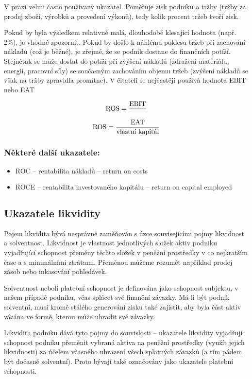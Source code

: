V praxi velmi často používaný ukazatel. Poměřuje zisk podniku a tržby (tržby za prodej zboží, výrobků a provedení výkonů), tedy kolik procent tržeb tvoří zisk.

Pokud by byla výsledkem relativně malá, dlouhodobě klesající hodnota (např. 2\%), je vhodné zpozornit. Pokud by došlo k náhlému poklesu tržeb při zachování nákladů (což je běžné), je zřejmé, že se podnik dostane do finančních potíží. Stejnětak se může dostat do potíží při zvýšení nákladů (zdražení materiálu, energií, pracovní síly) se současným zachováním objemu tržeb (zvýšení nákladů se však na tržby zpravidla promítne). 
V čitateli se nejčastěji používá hodnota EBIT nebo EAT

$$\text{ROS} = \dfrac{\text{EBIT}}{\text{}}$$ 
$$\text{ROS} = \dfrac{\text{EAT}}{\text{vlastní kapitál}}$$ 

\subsubsection{Některé další ukazatele:}
\begin{itemize}
\item{ROC -- rentabilita nákladů} -- return on costs
\item{ROCE -- rentabilita investovaného kapitálu} -- return on capital employed
\end{itemize}







\subsection{Ukazatele likvidity}
Pojem likvidita bývá nesprávně zaměňován s úzce souvisejícími pojmy likvidnost a solventnost. Likvidnost je vlastnost jednotlivých složek aktiv podniku vyjadřující schopnost přeměny těchto složek v peněžní prostředky v co nejkratším čase a s minimálními ztrátami\cite{nyvlt}. Přeměnou můžeme rozumět například prodej zásob nebo inkasování pohledávek. 

Solventnost neboli platební schopnost je definována jako schopnost subjektu, v našem případě podniku, včas splácet své finanční závazky. Má-li být podnik solventní, musí kromě stálého generování zisku také zajistit, aby byla část aktiv vázána ve formě, kterou může uhradit své závazky.

Likvidita podniku dává tyto pojmy do souvislosti -- ukazatele likvidity vyjadřují schopnost podniku přeměnit vybraná aktiva na peněžní prostředky (využít jejich likvidnosti) za účelem včasného uhrazení všech splatných závazků (a tím pádem být dočasně solventní)\cite{schol}. Proto bývají také označovány jako ukazatele platební schopnosti.

